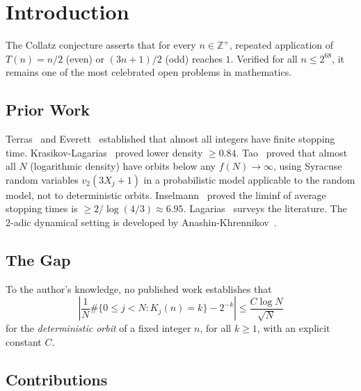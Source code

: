 \documentclass[12pt]{article}
\theoremstyle{definition}
\theoremstyle{remark}
\begin{document}
\section{Introduction}

The Collatz conjecture asserts that for every $n\in\mathbb{Z}^+$,
repeated application of $T(n)=n/2$ (even) or $(3n+1)/2$ (odd) reaches $1$.
Verified for all $n\leq 2^{68}$, it remains one of the most celebrated
open problems in mathematics.

\subsection{Prior Work}

Terras~\cite{Terras1976} and Everett~\cite{Everett1977} established
that almost all integers have finite stopping time.
Krasikov-Lagarias~\cite{Krasikov2003} proved lower density $\geq 0.84$.
Tao~\cite{Tao2022} proved that almost all $N$ (logarithmic density)
have orbits below any $f(N)\to\infty$, using Syracuse random variables
$v_2(3X_j+1)$ in a probabilistic model applicable to the random model,
not to deterministic orbits.
Inselmann~\cite{Inselmann2024} proved the liminf of average stopping
times is $\geq 2/\log(4/3)\approx 6.95$.
Lagarias~\cite{Lagarias2010} surveys the literature.
The 2-adic dynamical setting is developed by
Anashin-Khrennikov~\cite{Anashin2009}.

\subsection{The Gap}

To the author's knowledge, no published work establishes that
\[
\left|\frac{1}{N}\#\{0\leq j<N:K_j(n)=k\}-2^{-k}\right|
\leq\frac{C\log N}{\sqrt{N}}
\]
for the \emph{deterministic orbit} of a fixed integer $n$, for all
$k\geq 1$, with an explicit constant $C$.

\subsection{Contributions}
\end{document}
